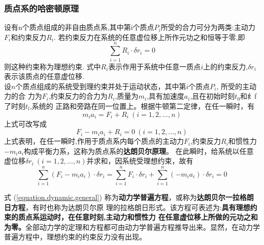 \documentclass{article}
\begin{document}
\subsubsection{质点系的哈密顿原理}
设有n个质点组成的非自由质点系,其中第i个质点$P_i$所受的合力可分为两类:主动力$F_i$和约束反力$R_i$. 若约束反力在系统的任意虚位移上所作元功之和恒等于零,即
\begin{equation}
\sum_{i=1}^n R_i \cdot \delta r_i =0
\end{equation}
则这种约束称为理想约束. 式中$R_i$表示作用于系统中任意一质点$i$上的约束反力,$\delta r_i$表示该质点的任意虚位移.
\\
设$n$个质点组成的系统受到理约束并处于运动状态，其中第$i$个质点$P_i$, 所受的主动力的合 力为$F_i$,约束反力的合力为$R_i$,质量为$m_i$,具有加速度$a_i$,且在初始时刻$t_0$和纟f 了时刻$t_l$,系统的 正路和旁路在同一位置上。根据牛顿第二定律，在任一瞬时，有
\begin{equation}
 m_i a_i = F_i + R_i  ~(i=1,2,\ldots,n)
\end{equation}
上式可改写成
\begin{equation}
   F_i- m_i a_i + R_i =0 ~(i=1,2,\ldots,n)
\end{equation}
上式表明，在任一瞬时,作用于质点系内每个质点的主动力$F_i$,约束反力$R_i$和惯性力$-m_ia_i$构成平衡力系，这称为质点系的\textbf{达朗贝尔原理}。
在此瞬时，给系统以任意虚位移$\delta r_i ~ (i=1,2,\ldots,n)$并求和，因系统受理想约束，故有
\begin{equation}
 \sum_{i=1}^n(F_i - m_i a_i)\cdot \delta r_i =\sum_{i=1}^nF_i \cdot \delta r_i +\sum_{i=1}^n(- m_i a_i)\cdot \delta r_i=0
 \label{equation.dynamic.general}
\end{equation}

式 (\ref{equation.dynamic.general})
称为\textbf{动力学普遍方程}，或称为\textbf{达朗贝尔一拉格朗日方程}，有时也称为达朗贝尔原 理的拉格朗日形式。该方程可表述为:\textbf{具有理想约束的质点系运动时，在任意时刻,主动力和惯性力 在任意虚位移上所做的元功之和为零。}全部动力学的定理和方程都可由动力学普遍方程推导出来。显然，在动力学普遍方程中，理想约束的约束反力没有出现。
\end{document}
